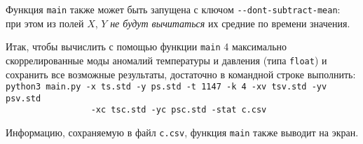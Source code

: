 Функция \texttt{main} также может быть запущена с ключом \texttt{-{}-dont-subtract-mean}: при этом из полей $X$, $Y$ \textit{не будут вычитаться} их средние по времени значения.

Итак, чтобы вычислить с помощью функции \texttt{main} 4 максимально скоррелированные моды аномалий температуры и давления (типа \texttt{float}) и сохранить все возможные результаты, достаточно в командной строке выполнить:\\
\verb|python3 main.py -x ts.std -y ps.std -t 1147 -k 4 -xv tsv.std -yv psv.std|\\
\verb|                 -xc tsc.std -yc psc.std -stat c.csv|

Информацию, сохраняемую в файл \texttt{c.csv}, функция \texttt{main} также выводит на экран.